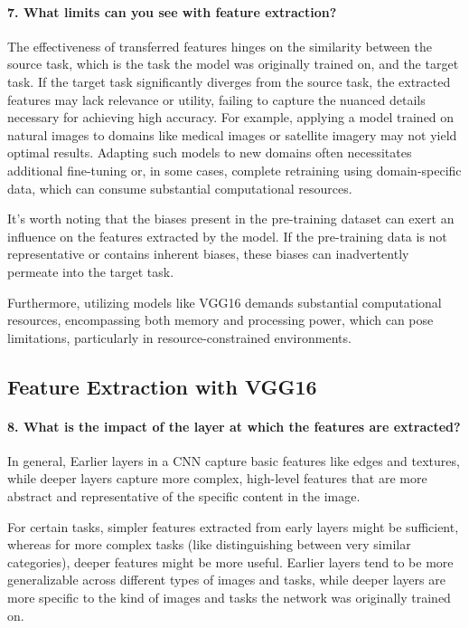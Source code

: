 \paragraph{7. What limits can you see with feature extraction?}
The effectiveness of transferred features hinges on the similarity between the source task, which is the task the model was originally trained on, and the target task. If the target task significantly diverges from the source task, the extracted features may lack relevance or utility, failing to capture the nuanced details necessary for achieving high accuracy. For example, applying a model trained on natural images to domains like medical images or satellite imagery may not yield optimal results. Adapting such models to new domains often necessitates additional fine-tuning or, in some cases, complete retraining using domain-specific data, which can consume substantial computational resources.

It's worth noting that the biases present in the pre-training dataset can exert an influence on the features extracted by the model. If the pre-training data is not representative or contains inherent biases, these biases can inadvertently permeate into the target task.

Furthermore, utilizing models like VGG16 demands substantial computational resources, encompassing both memory and processing power, which can pose limitations, particularly in resource-constrained environments.

\subsection{Feature Extraction with VGG16}
\paragraph{8. What is the impact of the layer at which the features are extracted?}
In general, Earlier layers in a CNN capture basic features like edges and textures, while deeper layers capture more complex, high-level features that are more abstract and representative of the specific content in the image.

For certain tasks, simpler features extracted from early layers might be sufficient, whereas for more complex tasks (like distinguishing between very similar categories), deeper features might be more useful. Earlier layers tend to be more generalizable across different types of images and tasks, while deeper layers are more specific to the kind of images and tasks the network was originally trained on.

